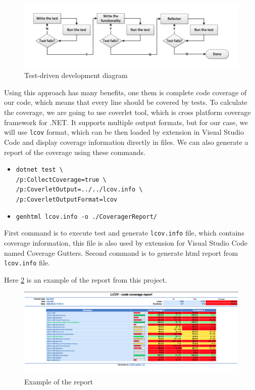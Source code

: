\begin{figure}[H]
    \centering
    \includegraphics[width=\textwidth]{content/Test-Driven-Development-activities.png}
    \caption{Test-driven development diagram \cite{noauthor_continuous_2013}}
    \label{fig:tddDiagram}
\end{figure}

Using this approach has many benefits, one them is complete code coverage of our code, which means that every line should be covered by tests. To calculate
the coverage, we are going to use coverlet tool, which is cross platform coverage framework for .NET. \cite{noauthor_coverlet_2022} It supports multiple output
formats, but for our case, we will use \texttt{lcov} format, which can be then loaded by extension in Visual Studio Code and display coverage information directly in files.
We can also generate a report of the coverage using these commands.
\begin{itemize}
    \item {\texttt{dotnet test \textbackslash\\
              /p:CollectCoverage=true \textbackslash\\/p:CoverletOutput=../../lcov.info \textbackslash\\/p:CoverletOutputFormat=lcov}}
    \item {\texttt{genhtml lcov.info -o ./CoveragerReport/}}
\end{itemize}
First command is to execute test and generate \texttt{lcov.info} file, which contains coverage information, this file is also used by extension for Visual Studio Code
named Coverage Gutters.
Second command is to generate html report from \texttt{lcov.info} file.

Here \ref{fig:report} is an example of the report from this project.

\begin{figure}[H]
    \centering
    \includegraphics[width=\textwidth]{content/coverage_report.png}
    \caption{Example of the report}
    \label{fig:report}
\end{figure}

